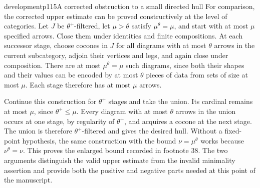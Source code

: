 \begin{dcomment}{development}{p115}{A corrected obstruction to a small directed hull}
For comparison, the corrected upper estimate can be proved constructively at the level of categories. Let $J$ be $\theta^+$-filtered, let $\mu>\theta$ satisfy $\mu^\theta=\mu$, and start with at most $\mu$ specified arrows. Close them under identities and finite compositions. At each successor stage, choose cocones in $J$ for all diagrams with at most $\theta$ arrows in the current subcategory, adjoin their vertices and legs, and again close under composition. There are at most $\mu^\theta=\mu$ such diagrams, since both their shapes and their values can be encoded by at most $\theta$ pieces of data from sets of size at most $\mu$. Each stage therefore has at most $\mu$ arrows.

Continue this construction for $\theta^+$ stages and take the union. Its cardinal remains at most $\mu$, since $\theta^+\leq\mu$. Every diagram with at most $\theta$ arrows in the union occurs at one stage, by regularity of $\theta^+$, and acquires a cocone at the next stage. The union is therefore $\theta^+$-filtered and gives the desired hull. Without a fixed-point hypothesis, the same construction with the bound $\nu=\mu^\theta$ works because $\nu^\theta=\nu$. This proves the enlarged bound recorded in footnote 38. The two arguments distinguish the valid upper estimate from the invalid minimality assertion and provide both the positive and negative parts needed at this point of the manuscript.
\end{dcomment}


